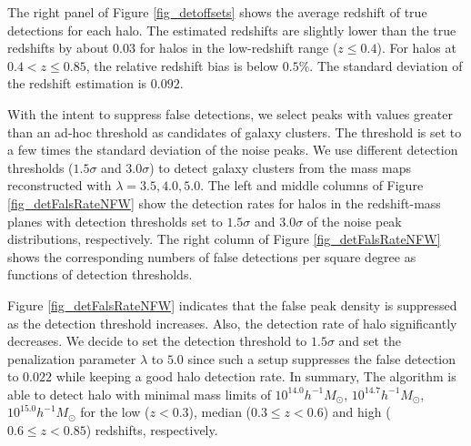 The right panel of Figure \ref{fig_detoffsets} shows the average redshift of
true detections for each halo. The estimated redshifts are slightly lower than
the true redshifts by about $0.03$ for halos in the low-redshift range ($z\leq
0.4$).  For halos at $0.4<z\leq 0.85$, the relative redshift bias is below
$0.5\%$. The standard deviation of the redshift estimation is $0.092$.

With the intent to suppress false detections, we select peaks with values
greater than an ad-hoc threshold as candidates of galaxy clusters.  The
threshold is set to a few times the standard deviation of the noise peaks. We
use different detection thresholds ($1.5\sigma$ and $3.0\sigma$) to detect
galaxy clusters from the mass maps reconstructed with $\lambda=3.5,4.0,5.0$.
The left and middle columns of Figure \ref{fig_detFalsRateNFW} show the
detection rates for halos in the redshift-mass planes with detection thresholds
set to $1.5\sigma$ and $3.0\sigma$ of the noise peak distributions,
respectively.  The right column of Figure \ref{fig_detFalsRateNFW} shows the
corresponding numbers of false detections per square degree as functions of
detection thresholds.

Figure \ref{fig_detFalsRateNFW} indicates that the false peak density is suppressed
as the detection threshold increases. Also, the detection rate of halo
significantly decreases. We decide to set the detection threshold to
$1.5\sigma$ and set the penalization parameter $\lambda$ to $5.0$ since such a
setup suppresses the false detection to $0.022$ while keeping a good halo
detection rate.
In summary, The algorithm is able to detect halo with minimal mass limits of
$10^{14.0} h^{-1}M_{\odot}$, $10^{14.7} h^{-1}M_{\odot}$, $10^{15.0}
h^{-1}M_{\odot}$ for the low ($z<0.3$), median ($0.3\leq z< 0.6$) and high
($0.6\leq z< 0.85$) redshifts, respectively.

